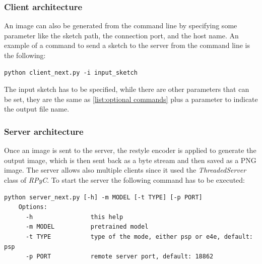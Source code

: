 \subsubsection{Client architecture}
An image can also be generated from the command line by specifying some parameter like the sketch path, the connection port, and the host name. An example of a command to send a sketch to the server from the command line is the following:
\begin{lstlisting}[numbers=none]
    python client_next.py -i input_sketch
\end{lstlisting}
The input sketch has to be specified, while there are other parameters that can be set, they are the same as \ref{list:optional commands} plus a parameter to indicate the output file name.


\subsubsection{Server architecture}
Once an image is sent to the server, the restyle encoder is applied to generate the output image, which is then sent back as a byte stream and then saved as a PNG image. The server allows also multiple clients since it used the \textit{ThreadedServer} class of \textit{RPyC}.
To start the server the following command has to be executed:
\begin{lstlisting}[numbers=none]
    python server_next.py [-h] -m MODEL [-t TYPE] [-p PORT]
    Options:
      -h                this help
      -m MODEL          pretrained model
      -t TYPE           type of the mode, either psp or e4e, default: psp
      -p PORT           remote server port, default: 18862
\end{lstlisting}
